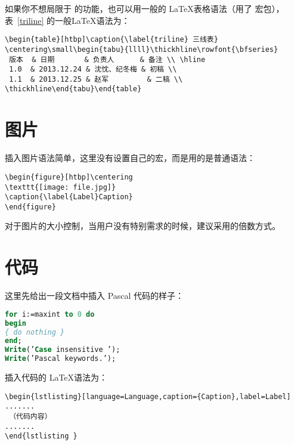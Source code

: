 如果你不想局限于  的功能，也可以用一般的 \LaTeX 表格语法（用了  宏包），表~\ref{triline} 的一般\LaTeX 语法为：
\begin{lstlisting}[language={[LaTeX]TeX},caption={三线表的一般\LaTeX 语法示例}]
\begin{table}[htbp]\caption{\label{triline} 三线表}
\centering\small\begin{tabu}{llll}\thickhline\rowfont{\bfseries}
 版本  & 日期       & 负责人      & 备注 \\ \hline
 1.0  & 2013.12.24 & 沈忱、纪冬梅 & 初稿 \\
 1.1  & 2013.12.25 & 赵军         & 二稿 \\
\thickhline\end{tabu}\end{table}
\end{lstlisting}

\section{图片}
插入图片语法简单，这里没有设置自己的宏，而是用的是普通语法：
\begin{lstlisting}[language={[LaTeX]TeX},caption={插入图片语法示例}]
\begin{figure}[htbp]\centering
\texttt{[image: file.jpg]} 
\caption{\label{Label}Caption}
\end{figure}\end{lstlisting}
对于图片的大小控制，当用户没有特别需求的时候，建议采用的倍数方式。

\section{代码}
这里先给出一段文档中插入 Pascal 代码的样子：
\begin{lstlisting}[language=Pascal,caption={Pascal 代码示例},label=PascalExample]
for i:=maxint to 0 do
begin
{ do nothing }
end;
Write(’Case insensitive ’);
Write(’Pascal keywords.’);
\end{lstlisting}

插入代码的 \LaTeX 语法为：
\begin{lstlisting}[language={[LaTeX]TeX},caption={插入代码的语法}]
\begin{lstlisting}[language=Language,caption={Caption},label=Label]
.......
 （代码内容）
.......
\end{lstlisting }\end{lstlisting}

